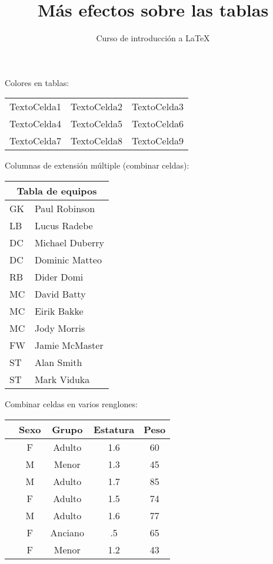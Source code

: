 \documentclass[10pt,letterpaper]{article}
\title{Más efectos sobre las tablas}
\author{Curso de introducción a LaTeX}
\begin{document}
Colores en tablas:\\
\begin{tabular}{ccc}
    \rowcolor{LightBlue} TextoCelda1 & TextoCelda2 & TextoCelda3 \\
    TextoCelda4 & TextoCelda5 & TextoCelda6 \\
    TextoCelda7 & TextoCelda8 & TextoCelda9
\end{tabular}

\vspace{1cm}

Columnas de extensión múltiple (combinar celdas):\\
\begin{tabular}{ |l|l| }
  \hline
  \multicolumn{2}{|c|}{Tabla de equipos} \\
  \hline
  GK & Paul Robinson \\
  LB & Lucus Radebe \\
  DC & Michael Duberry \\
  DC & Dominic Matteo \\
  RB & Dider Domi \\
  MC & David Batty \\
  MC & Eirik Bakke \\
  MC & Jody Morris \\
  FW & Jamie McMaster \\
  ST & Alan Smith \\
  ST & Mark Viduka \\
  \hline
\end{tabular}

\vspace{1cm}

Combinar celdas en varios renglones:\\
\begin{tabular}{ccccc}
	\hline
	& \textbf{Sexo} & \textbf{Grupo} & \textbf{Estatura} & \textbf{Peso}\\
	\hline
	\multirow{6}{*}{\rotatebox{90}{\textbf{Observaciones }}} & F & Adulto & 1.6 & 60\\
	& M & Menor & 1.3 & 45\\
	& M & Adulto & 1.7 & 85\\
	& F & Adulto & 1.5 & 74\\
	& M & Adulto & 1.6 & 77\\
	& F & Anciano & .5 & 65\\
	& F & Menor & 1.2 & 43\\
	\hline
\end{tabular}
\end{document}

